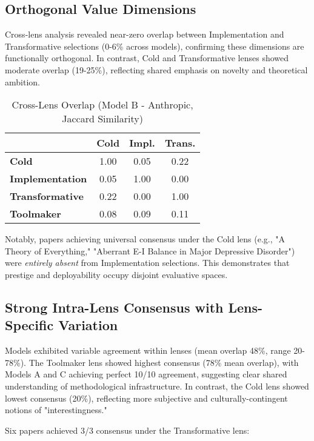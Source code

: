 \documentclass{article}
\begin{document}
\subsection{Orthogonal Value Dimensions}

Cross-lens analysis revealed near-zero overlap between Implementation and Transformative selections (0-6\% across models), confirming these dimensions are functionally orthogonal. In contrast, Cold and Transformative lenses showed moderate overlap (19-25\%), reflecting shared emphasis on novelty and theoretical ambition.

\begin{table}[htbp]
\centering
\caption{Cross-Lens Overlap (Model B - Anthropic, Jaccard Similarity)}
\label{tab:overlap}
\begin{tabular}{lccc}
\toprule
& \textbf{Cold} & \textbf{Impl.} & \textbf{Trans.} \\
\midrule
\textbf{Cold} & 1.00 & 0.05 & 0.22 \\
\textbf{Implementation} & 0.05 & 1.00 & 0.00 \\
\textbf{Transformative} & 0.22 & 0.00 & 1.00 \\
\textbf{Toolmaker} & 0.08 & 0.09 & 0.11 \\
\bottomrule
\end{tabular}
\end{table}

Notably, papers achieving universal consensus under the Cold lens (e.g., "A Theory of Everything," "Aberrant E-I Balance in Major Depressive Disorder") were \textit{entirely absent} from Implementation selections. This demonstrates that prestige and deployability occupy disjoint evaluative spaces.

\subsection{Strong Intra-Lens Consensus with Lens-Specific Variation}

Models exhibited variable agreement within lenses (mean overlap 48\%, range 20-78\%). The Toolmaker lens showed highest consensus (78\% mean overlap), with Models A and C achieving perfect 10/10 agreement, suggesting clear shared understanding of methodological infrastructure. In contrast, the Cold lens showed lowest consensus (20\%), reflecting more subjective and culturally-contingent notions of "interestingness."

Six papers achieved 3/3 consensus under the Transformative lens:
\end{document}
